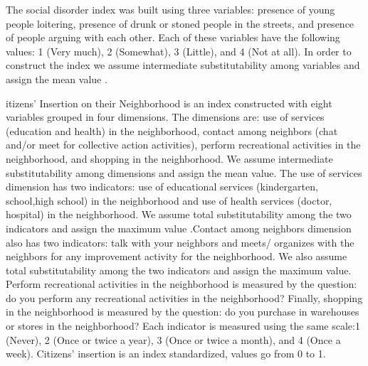 \newpage

The social disorder index was built using three variables: presence of young
people loitering, presence of drunk or stoned people in the streets, and
presence of people arguing with each other. Each of these variables have the
following values: 1 (Very much), 2 (Somewhat), 3 (Little), and 4 (Not at all).
In order to construct the index we assume intermediate substitutability among
variables and assign the mean value \cite{goertz2006social}.

itizens' Insertion on their Neighborhood is an index constructed with eight variables grouped in four dimensions. The dimensions are: use of services (education and health) in the neighborhood, contact among neighbors (chat and/or meet for collective action activities), perform recreational activities in the neighborhood, and shopping in the neighborhood. We assume intermediate substitutability among dimensions and assign the mean value. The use of services dimension has two indicators: use of educational services (kindergarten, school,high school) in the neighborhood and use of health services (doctor, hospital) in the neighborhood. We assume total substitutability among the two indicators and assign the maximum value  \cite{goertz2006social}.Contact among neighbors dimension also has two indicators: talk with your neighbors and meets/ organizes with the neighbors for any improvement activity for the neighborhood. We also assume total substitutability among the two indicators and assign the maximum value. Perform recreational activities in the neighborhood is measured by the question: do you perform any recreational activities in the neighborhood? Finally, shopping in the neighborhood is measured by the question: do you purchase in warehouses or stores in the neighborhood? Each indicator is measured using the same scale:1 (Never), 2 (Once or twice a year), 3 (Once or twice a month), and 4 (Once a week).  Citizens' insertion is an index standardized, values go from 0 to 1.

